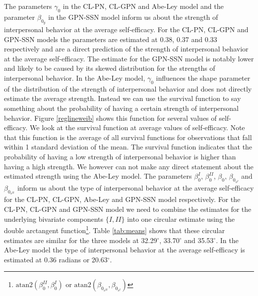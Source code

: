 \documentclass[man,mask]{apa6}
\let\rmarkdownfootnote\footnote%
\def\footnote{\protect\rmarkdownfootnote}
\begin{document}
The parameters \(\gamma_0\) in the CL-PN, CL-GPN and Abe-Ley model and the
parameter \(\beta_{0_y}\) in the GPN-SSN model inform us about the strength of
interpersonal behavior at the average self-efficacy. For the CL-PN, CL-GPN and
GPN-SSN models the parameters are estimated at 0.38, 0.37 and 0.33 respectively
and are a direct prediction of the strength of interpersonal behavior at the
average self-efficacy. The estimate for the GPN-SSN model is notably lower and
likely to be caused by its skewed distribution for the strengths of
interpersonal behavior. In the Abe-Ley model, \(\gamma_0\) influences the shape
parameter of the distribution of the strength of interpersonal behavior and does
not directly estimate the average strength. Instead we can use the survival
function to say something about the probability of having a certain strength of
interpersonal behavior. Figure \ref{reglineweib} shows this function for several
values of self-efficacy. We look at the survival function at average values of
self-efficacy. Note that this function is the average of all survival functions
for observations that fall within 1 standard deviation of the mean. The survival
function indicates that the probability of having a low strength of
interpersonal behavior is higher than having a high strength. We however can not
make any direct statement about the estimated strength using the Abe-Ley
model.\newline
\indent The parameters \(\beta_0^{I}\), \(\beta_0^{II}\), \(\beta_0\),
\(\beta_{0_{s^{I}}}\) and \(\beta_{0_{s^{II}}}\) inform us about the type of
interpersonal behavior at the average self-efficacy for the CL-PN, CL-GPN,
Abe-Ley and GPN-SSN model respectively. For the CL-PN, CL-GPN and GPN-SSN model
we need to combine the estimates for the underlying bivariate components \(\{I, II\}\) into one circular estimate using the double arctangent
function\footnote{\(\mbox{atan2}(\beta_0^{II}, \beta_0^{I})\) or
\(\mbox{atan2}(\beta_{0_{s^{II}}}, \beta_{0_{s^{I}}})\)}.
Table \ref{tab:means} shows that these circular estimates are similar for the
three models at 32.29\(^\circ\), 33.70\(^\circ\) and 35.53\(^\circ\). In the Abe-Ley
model the type of interpersonal behavior at the average self-efficacy is
estimated at 0.36 radians or 20.63\(^\circ\).
\end{document}
